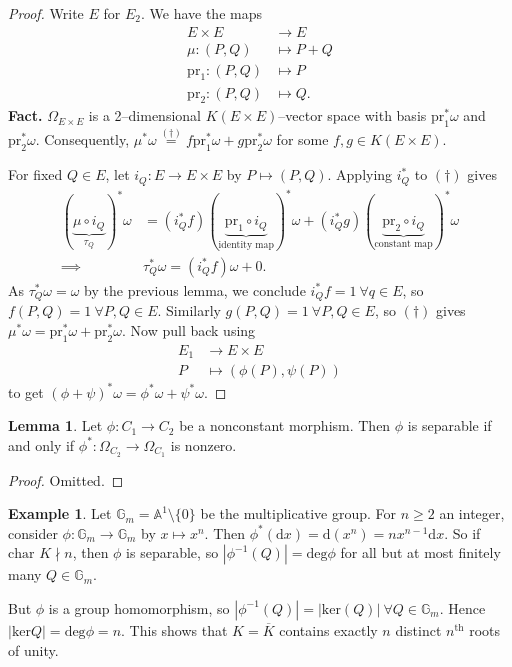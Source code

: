 \documentclass{article}
\theoremstyle{definition}
\newtheorem{lemma}[theorem]{Lemma}
\newtheorem{example}{Example}[section]
\begin{document}
\begin{proof}
    Write $E$ for $E_2$. We have the maps
    \begin{align*}
        E \times E &\to E \\
        \mu: (P,Q) &\mapsto P +Q\\
        \text{pr}_1 : (P,Q)&\mapsto P\\
        \text{pr}_2 : (P,Q)&\mapsto Q. 
    \end{align*}
    \textbf{Fact.} $\Omega_{E \times E}$ is a 2--dimensional $K(E \times E)$--vector space with basis $\text{pr}_1^*\omega$ and $\text{pr}_2^*\omega$. Consequently, $\mu^* \omega \stackrel{(\dagger)}{=} f \text{pr}_1^* \omega + g \text{pr}_2^* \omega$ for some $f,g \in K(E \times E)$.
    \vspace{1mm}
     
    For fixed $Q \in E$, let $i_Q : E \to E \times E$ by $P \mapsto (P,Q)$. Applying $i^*_Q$ to $(\dagger)$ gives 
    \begin{align*}
        (\underbrace{\mu \circ i_Q}_{\tau_Q})^* \omega &= (i_Q^* f)(\underbrace{\text{pr}_1 \circ i_Q}_{\text{identity map}})^* \omega + (i_Q^* g)(\underbrace{\text{pr}_2 \circ i_Q}_{\text{constant map}})^* \omega\\
        \implies & \tau_Q^* \omega = (i_Q^*f)\omega + 0.
    \end{align*}
    As $\tau_Q^*\omega = \omega$ by the previous lemma, we conclude $i_Q^*f = 1 ~\forall q \in E$, so $f(P,Q) = 1 ~\forall P,Q \in E$. Similarly $g(P,Q) = 1 ~\forall P,Q \in E$, so $(\dagger)$ gives $\mu^* \omega = \text{pr}_1^* \omega + \text{pr}_2^* \omega$. Now pull back using
    \begin{align*}
        E_1 &\to E \times E\\
        P &\mapsto (\phi(P),\psi(P))
    \end{align*}
    to get $(\phi+\psi)^*\omega = \phi^* \omega + \psi^* \omega$.
\end{proof}
\begin{lemma}\label{lemma6.4}
    Let $\phi : C_1 \to C_2$ be a nonconstant morphism. Then $\phi$ is separable if and only if $\phi^* : \Omega_{C_2} \to \Omega_{C_1}$ is nonzero.
\end{lemma}
\begin{proof}
    Omitted.
\end{proof}
\begin{example}
    Let $\mathbb{G}_m = \mathbb{A}^1 \setminus \{0\}$ be the multiplicative group. For $n\ge 2$ an integer, consider $\phi : \mathbb{G}_m \to \mathbb{G}_m$ by $x \mapsto x^n$. Then $\phi^*(\mathrm{d}x)=\mathrm{d}(x^n)=nx^{n-1}\mathrm{d}x$. So if $\text{char }K \nmid n$, then $\phi$ is separable, so $\left|\phi^{-1}(Q)\right|=\text{deg} \phi$ for all but at most finitely many $Q \in \mathbb{G}_m$.
    \vspace{1mm}
     
    But $\phi$ is a group homomorphism, so $\left|\phi^{-1}(Q)\right|=\left|\text{ker}(Q)\right| ~\forall Q \in \mathbb{G}_m$. Hence $\left|\text{ker}Q \right| = \text{deg}\phi = n$. This shows that $K = \overline{K}$ contains exactly $n$ distinct $n^{\text{th}}$ roots of unity.
\end{example}
\end{document}
